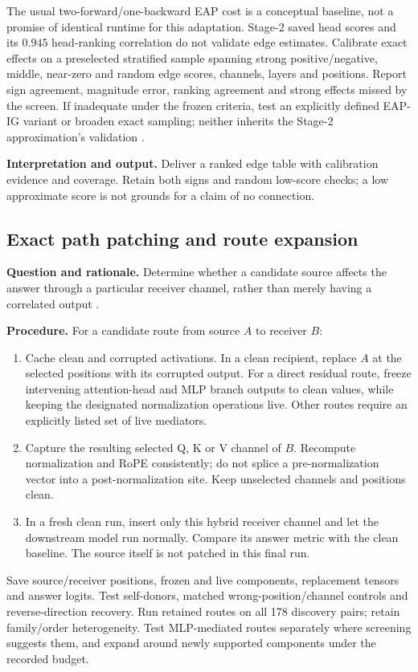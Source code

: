 \documentclass[11pt,a4paper]{article}
\newcommand{\purpose}{\textbf{Question and rationale.} }
\newcommand{\procedure}{\textbf{Procedure.} }
\newcommand{\interpretation}{\textbf{Interpretation and output.} }
\begin{document}
The usual two-forward/one-backward EAP cost is a conceptual baseline, not a
promise of identical runtime for this adaptation. Stage-2 saved head scores and
its $0.945$ head-ranking correlation do not validate edge estimates.
Calibrate exact effects on a preselected stratified sample spanning strong
positive/negative, middle, near-zero and random edge scores, channels, layers
and positions. Report sign agreement, magnitude error, ranking agreement and
strong effects missed by the screen. If inadequate under the frozen criteria,
test an explicitly defined EAP-IG variant or broaden exact sampling; neither
inherits the Stage-2 approximation's validation \cite{faith}.

\interpretation Deliver a ranked edge table with calibration evidence and
coverage. Retain both signs and random low-score checks; a low approximate score
is not grounds for a claim of no connection.

\subsection{Exact path patching and route expansion}
\purpose Determine whether a candidate source affects the answer through a
particular receiver channel, rather than merely having a correlated output
\cite{ioi,patchguide}.

\procedure For a candidate route from source $A$ to receiver $B$:
\begin{enumerate}
\item Cache clean and corrupted activations. In a clean recipient, replace
$A$ at the selected positions with its corrupted output. For a direct residual
route, freeze intervening attention-head and MLP branch outputs to clean
values, while keeping the designated normalization operations live. Other
routes require an explicitly listed set of live mediators.
\item Capture the resulting selected Q, K or V channel of $B$. Recompute
normalization and RoPE consistently; do not splice a pre-normalization vector
into a post-normalization site. Keep unselected channels and positions clean.
\item In a fresh clean run, insert only this hybrid receiver channel and let
the downstream model run normally. Compare its answer metric with the clean
baseline. The source itself is not patched in this final run.
\end{enumerate}
Save source/receiver positions, frozen and live components, replacement tensors
and answer logits. Test self-donors, matched wrong-position/channel controls and
reverse-direction recovery. Run retained routes on all 178 discovery pairs;
retain family/order heterogeneity. Test MLP-mediated routes separately where
screening suggests them, and expand around newly supported components under
the recorded budget.
\end{document}
